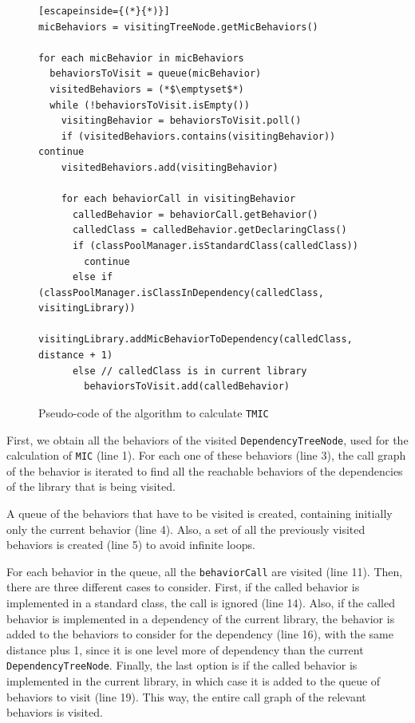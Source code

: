 \begin{figure}[ht!]
\begin{lstlisting}[escapeinside={(*}{*)}]
micBehaviors = visitingTreeNode.getMicBehaviors()

for each micBehavior in micBehaviors
  behaviorsToVisit = queue(micBehavior)
  visitedBehaviors = (*$\emptyset$*)
  while (!behaviorsToVisit.isEmpty())
    visitingBehavior = behaviorsToVisit.poll()
    if (visitedBehaviors.contains(visitingBehavior)) continue
    visitedBehaviors.add(visitingBehavior)

    for each behaviorCall in visitingBehavior
      calledBehavior = behaviorCall.getBehavior()
      calledClass = calledBehavior.getDeclaringClass()
      if (classPoolManager.isStandardClass(calledClass))
        continue
      else if (classPoolManager.isClassInDependency(calledClass, visitingLibrary))
        visitingLibrary.addMicBehaviorToDependency(calledClass, distance + 1)
      else // calledClass is in current library
        behaviorsToVisit.add(calledBehavior)
\end{lstlisting}
\caption{Pseudo-code of the algorithm to calculate \texttt{TMIC}}
\label{fig:calculate-tmic}
\end{figure}

First, we obtain all the behaviors of the visited \texttt{DependencyTreeNode}, used for the calculation of \texttt{MIC} (line 1). For each one of these behaviors (line 3), the call graph of the behavior is iterated to find all the reachable behaviors of the dependencies of the library that is being visited.

A queue of the behaviors that have to be visited is created, containing initially only the current behavior (line 4). Also, a set of all the previously visited behaviors is created (line 5) to avoid infinite loops.

For each behavior in the queue, all the \texttt{behaviorCall} are visited (line 11). Then, there are three different cases to consider. First, if the called behavior is implemented in a standard class, the call is ignored (line 14). Also, if the called behavior is implemented in a dependency of the current library, the behavior is added to the behaviors to consider for the dependency (line 16), with the same distance plus 1, since it is one level more of dependency than the current \texttt{DependencyTreeNode}. Finally, the last option is if the called behavior is implemented in the current library, in which case it is added to the queue of behaviors to visit (line 19). This way, the entire call graph of the relevant behaviors is visited.

